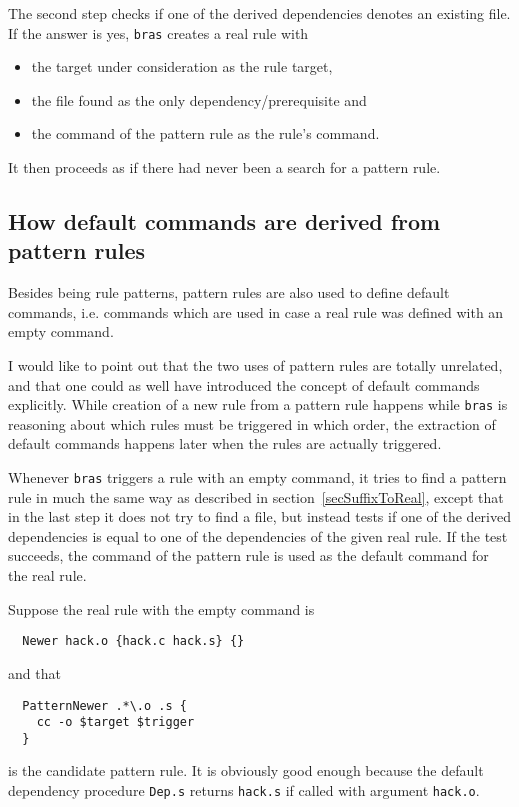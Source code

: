 \documentclass[12pt]{article}
\newcommand{\bras}{\texttt{bras}}
\begin{document}
The second step checks if one of
the derived dependencies denotes an existing file.
If the answer is yes, \bras{} creates a real rule with
\begin{itemize}
\item the target under consideration as the rule target,
\item the file found as the only dependency/prerequisite and
\item the command of the pattern rule as the rule's command.
\end{itemize}
It then proceeds as if there had never been a search for a pattern
rule.

\subsection{How default commands are derived from pattern rules}
\label{secSuffixAsDefCmd}
Besides being rule patterns, pattern rules are also used to define
default commands, i.e. commands which are used in case a real rule was
defined with an empty command.

I would like to point out that the two uses of pattern rules are
totally unrelated, and that one could as well have introduced the
concept of default commands explicitly. While creation of a new rule
from a pattern rule happens while \bras{} is reasoning about which rules
must be triggered in which order, the extraction of default commands
happens later when the rules are actually triggered. 

Whenever \bras{} triggers a rule with an empty command, it tries to
find a pattern rule in much the same way as described in
section~\ref{secSuffixToReal}, except that in the last step it does
not try to find a file, but instead tests if one of the derived
dependencies is equal to one of the dependencies of the given real
rule. If the test succeeds, the command of the pattern rule is used as
the default command for the real rule.

Suppose the real rule with the empty command is
\begin{verbatim}
  Newer hack.o {hack.c hack.s} {}
\end{verbatim}
and that
\begin{verbatim}
  PatternNewer .*\.o .s {
    cc -o $target $trigger
  }
\end{verbatim}
is the candidate pattern rule. It is obviously good enough
because the default dependency procedure \texttt{Dep.s} returns
\texttt{hack.s} if called with argument \texttt{hack.o}.
\end{document}
